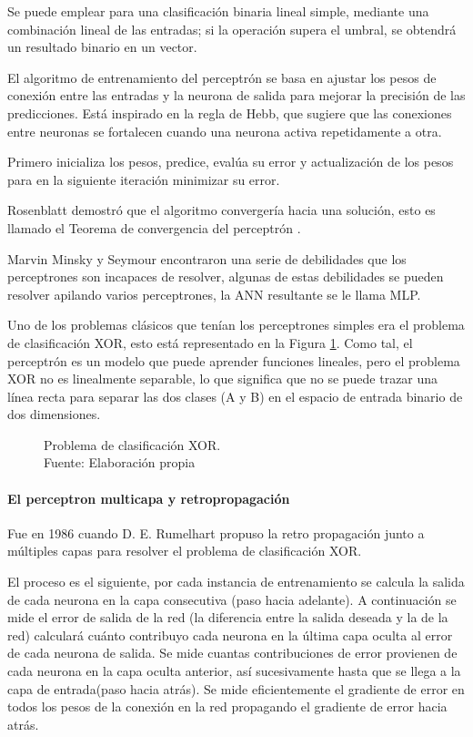 Se puede emplear para una clasificación binaria lineal simple, mediante una combinación lineal de las entradas; si la operación supera el umbral, se obtendrá un resultado binario en un vector.

El algoritmo de entrenamiento del perceptrón se basa en ajustar los pesos de conexión entre las entradas y la neurona de salida para mejorar la precisión de las predicciones. Está inspirado en la regla de Hebb, que sugiere que las conexiones entre neuronas se fortalecen cuando una neurona activa repetidamente a otra.

Primero inicializa los pesos, predice, evalúa su error y actualización de los pesos para en la siguiente iteración minimizar su error.

Rosenblatt demostró que el algoritmo convergería hacia una solución, esto es llamado el Teorema de convergencia del perceptrón \cite{geron2018neural}.

Marvin Minsky y Seymour encontraron una serie de debilidades que los perceptrones son incapaces de resolver, algunas de estas debilidades se pueden resolver apilando varios perceptrones, la \gls{ANN} resultante se le llama \gls{MLP}.

Uno de los problemas clásicos que tenían los perceptrones simples era el problema de clasificación XOR, esto está representado en la Figura \ref{fig:problem-xor}. Como tal, el perceptrón es un modelo que puede aprender funciones lineales, pero el problema XOR no es linealmente separable, lo que significa que no se puede trazar una línea recta para separar las dos clases (A y B) en el espacio de entrada binario de dos dimensiones.

\begin{figure}[H]
    \centering
    \centerline{}
    \caption{Problema de clasificación XOR.\\Fuente: Elaboración propia}
    \label{fig:problem-xor}
\end{figure}


\paragraph*{El perceptron multicapa y retropropagación}

Fue en 1986 cuando {D. E. Rumelhart} propuso la retro propagación junto a múltiples capas para resolver el problema de clasificación XOR.

El proceso es el siguiente, por cada instancia de entrenamiento se calcula la salida de cada neurona en la capa consecutiva (paso hacia adelante). A continuación se mide el error de salida de la red (la diferencia entre la salida deseada y la de la red) calculará cuánto contribuyo cada neurona en la última capa oculta al error de cada neurona de salida. Se mide cuantas contribuciones de error provienen de cada neurona en la capa oculta anterior, así sucesivamente hasta que se llega a la capa de entrada(paso hacia atrás). Se mide eficientemente el gradiente de error en todos los pesos de la conexión en la red propagando el gradiente de error hacia atrás. \cite{geron2018neural}

